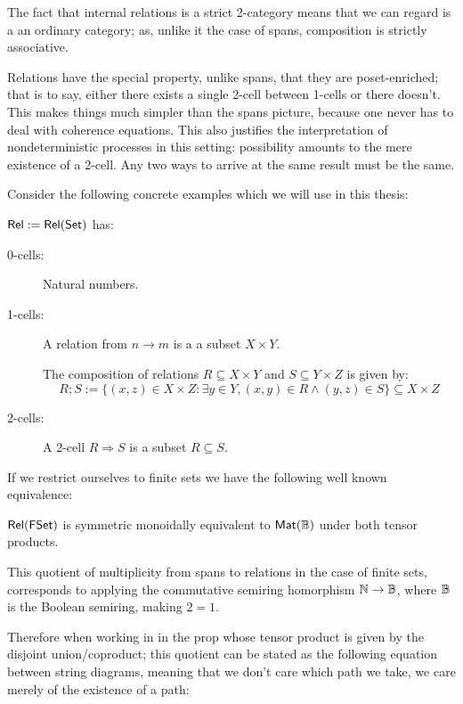 The fact that internal relations is a strict 2-category means that we can regard is a an ordinary category; as, unlike it the case of spans, composition is strictly associative.


Relations have the special property, unlike spans, that they are poset-enriched; that is to say, either there exists a single 2-cell between 1-cells or there doesn't. This makes things much simpler than the spans picture, because one never has to deal with coherence equations.  This also justifies the interpretation of nondeterministic processes in this setting: possibility amounts to the mere existence of a 2-cell.  Any two ways to arrive at the same result must be the same.





Consider the following concrete examples which we will use in this thesis:
\begin{example}
$\mathsf{Rel}:=\mathsf{Rel}(\mathsf{Set})$ has:

\begin{description}
\item[0-cells:] Natural numbers.

\item[1-cells:] A relation from $n\to m$ is a a subset $X \times Y$.

The composition of relations $R \subseteq X \times Y$  and $S \subseteq Y \times Z$ is given by:
$$
R;S := \{  (x,z) \in X\times Z: \exists y \in Y, (x,y) \in R \wedge (y,z) \in S \} \subseteq X\times Z
$$ 

\item[2-cells:] 
A 2-cell $R\Rightarrow S$ is a subset $R\subseteq S$.
\end{description}
\end{example}


If we restrict ourselves to finite sets we have the following well known equivalence:



\begin{lemma}[{\cite{????}}]
$\mathsf{Rel}(\mathsf{FSet})$ is symmetric monoidally equivalent to $\mathsf{Mat}(\mathbb{B})$ under both tensor products. 
\end{lemma}


This quotient of multiplicity from spans to relations in the case of finite sets, corresponds to applying the commutative semiring homorphism $\mathbb{N}\to \mathbb{B}$, where $\mathbb{B}$ is the Boolean semiring, making $2=1$.

Therefore when working in in the prop whose tensor product is given by the disjoint union/coproduct; this quotient can be stated as the following equation between string diagrams, meaning that we don't care which path we take, we care merely of the existence of a path:

